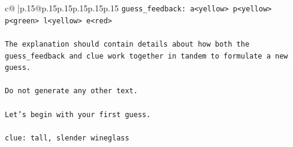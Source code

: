 \documentclass{article}
\begin{document}
{\begin{supertabular}{c@{$\;$}|p{.15\linewidth}@{}p{.15\linewidth}p{.15\linewidth}p{.15\linewidth}p{.15\linewidth}p{.15\linewidth}}
{{{\texttt{guess\_feedback: a<yellow> p<yellow> p<green> l<yellow> e<red>} \\
\\ 
\texttt{The explanation should contain details about how both the guess\_feedback and clue work together in tandem to formulate a new guess.} \\
\\ 
\texttt{Do not generate any other text.} \\
\\ 
\texttt{Let's begin with your first guess.} \\
\\ 
\texttt{clue: tall, slender wineglass} \\
            }
        }
    }
     \\ \\


\end{supertabular}}
\end{document}
